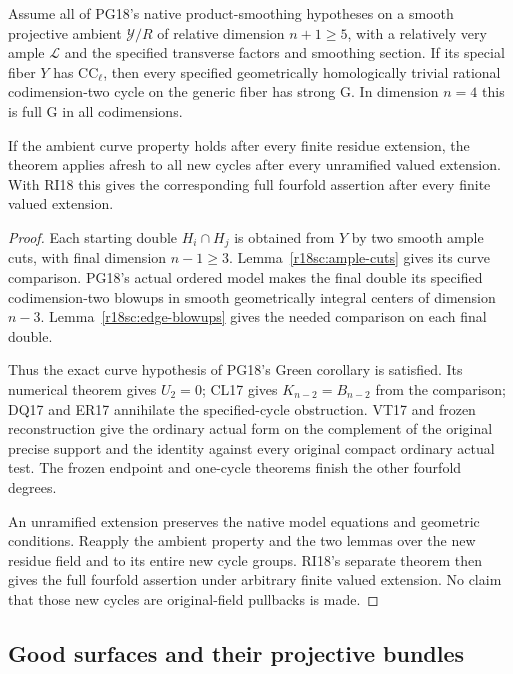 \begin{theorem}
\label{r18sc:PG-gate}
Assume all of PG18's native product-smoothing
hypotheses on a smooth projective ambient
$\mathcal Y/R$ of relative dimension $n+1\ge5$,
with a relatively very ample $\mathcal L$ and
the specified transverse factors and smoothing
section.  If its special fiber $Y$ has
$\mathrm{CC}_\ell$, then every specified
geometrically homologically trivial rational
codimension-two cycle on the generic fiber
has strong G.  In dimension $n=4$ this is
full G in all codimensions.

If the ambient curve property holds after
every finite residue extension, the theorem
applies afresh to all new cycles after every
unramified valued extension.  With RI18 this
gives the corresponding full fourfold assertion
after every finite valued extension.
\end{theorem}

\begin{proof}
Each starting double $H_i\cap H_j$ is obtained
from $Y$ by two smooth ample cuts, with final
dimension $n-1\ge3$.  Lemma~\ref{r18sc:ample-cuts}
gives its curve comparison.  PG18's actual
ordered model makes the final double its
specified codimension-two blowups in smooth
geometrically integral centers of dimension
$n-3$.  Lemma~\ref{r18sc:edge-blowups} gives
the needed comparison on each final double.

Thus the exact curve hypothesis of PG18's
Green corollary is satisfied.  Its numerical
theorem gives $U_2=0$; CL17 gives
$K_{n-2}=B_{n-2}$ from the comparison; DQ17
and ER17 annihilate the specified-cycle
obstruction.  VT17 and frozen reconstruction
give the ordinary actual form on the complement
of the original precise support and the identity
against every original compact ordinary actual
test.  The frozen endpoint and one-cycle
theorems finish the other fourfold degrees.

An unramified extension preserves the native
model equations and geometric conditions.
Reapply the ambient property and the two
lemmas over the new residue field and to
its entire new cycle groups.  RI18's
separate theorem then gives the full
fourfold assertion under arbitrary finite
valued extension.  No claim that those
new cycles are original-field pullbacks
is made.
\end{proof}

\subsection{Good surfaces and their projective bundles}

